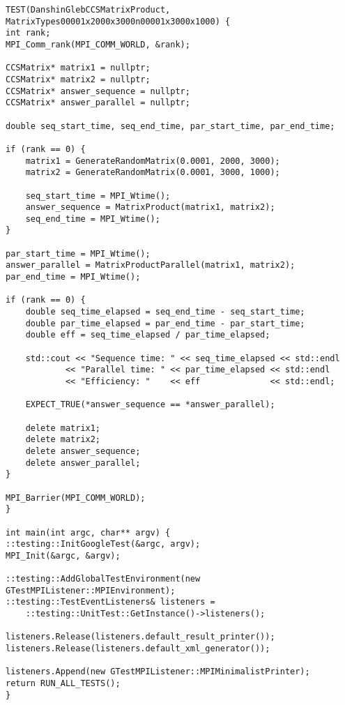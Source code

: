 \documentclass{report}
\begin{document}
\begin{lstlisting}
TEST(DanshinGlebCCSMatrixProduct, MatrixTypes00001x2000x3000n00001x3000x1000) {
int rank;
MPI_Comm_rank(MPI_COMM_WORLD, &rank);

CCSMatrix* matrix1 = nullptr;
CCSMatrix* matrix2 = nullptr;
CCSMatrix* answer_sequence = nullptr;
CCSMatrix* answer_parallel = nullptr;

double seq_start_time, seq_end_time, par_start_time, par_end_time;

if (rank == 0) {
    matrix1 = GenerateRandomMatrix(0.0001, 2000, 3000);
    matrix2 = GenerateRandomMatrix(0.0001, 3000, 1000);

    seq_start_time = MPI_Wtime();
    answer_sequence = MatrixProduct(matrix1, matrix2);
    seq_end_time = MPI_Wtime();
}

par_start_time = MPI_Wtime();
answer_parallel = MatrixProductParallel(matrix1, matrix2);
par_end_time = MPI_Wtime();

if (rank == 0) {
    double seq_time_elapsed = seq_end_time - seq_start_time;
    double par_time_elapsed = par_end_time - par_start_time;
    double eff = seq_time_elapsed / par_time_elapsed;

    std::cout << "Sequence time: " << seq_time_elapsed << std::endl
            << "Parallel time: " << par_time_elapsed << std::endl
            << "Efficiency: "    << eff              << std::endl;

    EXPECT_TRUE(*answer_sequence == *answer_parallel);

    delete matrix1;
    delete matrix2;
    delete answer_sequence;
    delete answer_parallel;
}

MPI_Barrier(MPI_COMM_WORLD);
}

int main(int argc, char** argv) {
::testing::InitGoogleTest(&argc, argv);
MPI_Init(&argc, &argv);

::testing::AddGlobalTestEnvironment(new GTestMPIListener::MPIEnvironment);
::testing::TestEventListeners& listeners =
    ::testing::UnitTest::GetInstance()->listeners();

listeners.Release(listeners.default_result_printer());
listeners.Release(listeners.default_xml_generator());

listeners.Append(new GTestMPIListener::MPIMinimalistPrinter);
return RUN_ALL_TESTS();
}
\end{lstlisting}
\end{document}
